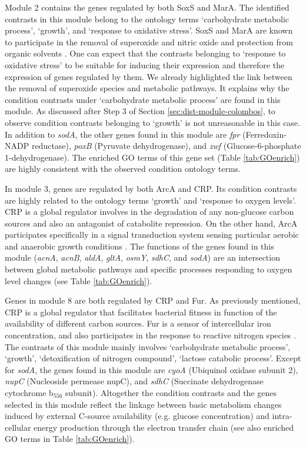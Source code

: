 Module 2 contains the genes regulated by both SoxS and MarA. The identified
contrasts in this module belong to the ontology terms `carbohydrate metabolic
process', `growth', and `response to oxidative stress'.
%
SoxS and MarA are known to participate in the removal of superoxide and nitric
oxide and protection from organic solvents \cite{Touati2000}.  One can expect
that the contrasts belonging to `response to oxidative stress' to be suitable
for inducing their expression and therefore the expression of genes regulated
by them. 
%
We already highlighted the link between the removal of superoxide species and
metabolic pathways.  It explains why the condition contrasts under
`carbohydrate metabolic process' are found in this module.  
%
As discussed after Step 3 of Section \ref{sec:dist-module-colombos}, to observe
condition contrasts belonging to `growth' is not unreasonable in this case.  
%
In addition to \textit{sodA}, the other genes found in this module are
\textit{fpr} (Ferredoxin-NADP reductase), \textit{poxB} (Pyruvate
dehydrogenase), and \textit{zwf} (Glucose-6-phosphate 1-dehydrogenase). The
enriched GO terms of this gene set (Table \ref{tab:GOenrich}) are highly
consistent with the observed condition ontology terms.


In module 3, genes are regulated by both ArcA and CRP. Its condition
contrasts are highly related to the ontology terms `growth' and
`response to oxygen levels'. 
%
CRP is a global regulator involves in the degradation of any non-glucose carbon
sources and also an antagonist of catabolite repression. 
%
On the other hand, ArcA participates specifically in a signal transduction
system sensing particular aerobic and anaerobic growth conditions
\cite{Compan1994}.  
%
The functions of the genes found in this module (\textit{acnA}, \textit{acnB},
\textit{aldA}, \textit{gltA}, \textit{osmY}, \textit{sdhC}, and \textit{sodA})
are an intersection between global metabolic pathways and specific processes
responding to oxygen level changes (see Table \ref{tab:GOenrich}).


Genes in module 8 are both regulated by CRP and Fur. As previously
mentioned, CRP is a global regulator that facilitates bacterial fitness
in function of the availability of different carbon sources. 
%
Fur is a sensor of intercellular iron concentration, and also participates in
the response to reactive nitrogen species \cite{Mukhopadhyay2004}.  
%
The contrasts of this module mainly involves `carbohydrate metabolic process',
`growth', `detoxification of nitrogen compound', `lactose catabolic
process'. 
%
Except for \textit{sodA}, the genes found in this module are \textit{cyoA}
(Ubiquinol oxidase subunit 2), \textit{nupC} (Nucleoside permease nupC), and
\textit{sdhC} (Succinate dehydrogenase cytochrome b$_{556}$ subunit).
%
Altogether the condition contrasts and the genes selected in this module
reflect the linkage between basic metabolism changes induced by external
C-source availability (e.g. glucose concentration) and intra-cellular energy
production through the electron transfer chain (see also enriched GO terms in
Table \ref{tab:GOenrich}).



